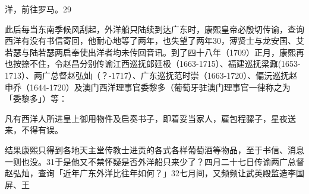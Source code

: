 \vfill
\begin{BookNotes}
\end{BookNotes}


\noindent 洋，前往罗马。29

此后每当东南季候风刮起，外洋船只陆续到达广东时，康熙皇帝必殷切传谕，查询西洋有没有书信寄回，他耐心地等了两年，也失望了两年30，薄贤士与龙安国、艾若瑟与陆若瑟两启奉使出洋者均未传回音讯。到了四十八年（1709）正月，康熙再也按捺不住，令赵昌分别传谕江西巡抚郎廷极（1663-1715）、福建巡抚梁鼐(1653-1713）、两广总督赵弘灿（？-1717）、广东巡抚范时崇（1663-1720）、偏沅巡抚赵申乔（1644-1720）及澳门西洋理事官委黎多（葡萄牙驻澳门理事官一律称之为「委黎多」）等：

\begin{BookQuote}
凡有西洋人所进皇上御用物件及启奏书子，即着妥当家人，雇包程骡子，星夜送来，不得有误。
\end{BookQuote}

结果康熙只得到各地天主堂传教士进贡的各式各样葡萄酒等物品，至于书信、消息一则也没。31于是他又不禁怀疑是否外洋船只来少了？四月二十七日传谕两广总督赵弘灿，查询「近年广东外洋比往年如何？」32七月间，又频频让武英殿监造李国屏、王

